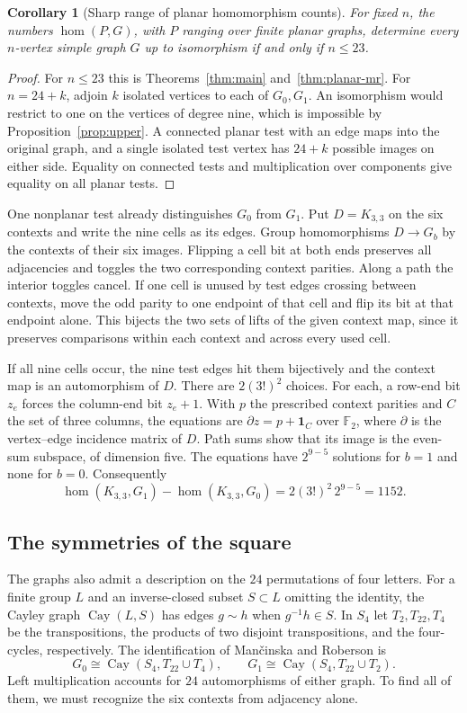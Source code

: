 \documentclass[11pt,reqno]{amsart}
\numberwithin{equation}{section}
\newtheorem{corollary}[theorem]{Corollary}
\theoremstyle{definition}
\newcommand{\homc}{\operatorname{hom}}
\begin{document}
\begin{corollary}[Sharp range of planar homomorphism counts]\label{cor:threshold}
For fixed $n$, the numbers $\homc(P,G)$, with $P$ ranging over finite planar graphs, determine every $n$-vertex simple graph $G$ up to isomorphism if and only if $n\le23$.
\end{corollary}
\begin{proof}
For $n\le23$ this is Theorems~\ref{thm:main} and~\ref{thm:planar-mr}. For $n=24+k$, adjoin $k$ isolated vertices to each of $G_0,G_1$. An isomorphism would restrict to one on the vertices of degree nine, which is impossible by Proposition~\ref{prop:upper}. A connected planar test with an edge maps into the original graph, and a single isolated test vertex has $24+k$ possible images on either side. Equality on connected tests and multiplication over components give equality on all planar tests.
\end{proof}

One nonplanar test already distinguishes $G_0$ from $G_1$. Put $D=K_{3,3}$ on the six contexts and write the nine cells as its edges. Group homomorphisms $D\to G_b$ by the contexts of their six images. Flipping a cell bit at both ends preserves all adjacencies and toggles the two corresponding context parities. Along a path the interior toggles cancel. If one cell is unused by test edges crossing between contexts, move the odd parity to one endpoint of that cell and flip its bit at that endpoint alone. This bijects the two sets of lifts of the given context map, since it preserves comparisons within each context and across every used cell.

If all nine cells occur, the nine test edges hit them bijectively and the context map is an automorphism of $D$. There are $2(3!)^2$ choices. For each, a row-end bit $z_e$ forces the column-end bit $z_e+1$. With $p$ the prescribed context parities and $C$ the set of three columns, the equations are $\partial z=p+\mathbf 1_C$ over $\mathbb F_2$, where $\partial$ is the vertex--edge incidence matrix of $D$. Path sums show that its image is the even-sum subspace, of dimension five. The equations have $2^{9-5}$ solutions for $b=1$ and none for $b=0$. Consequently
\[
      \homc(K_{3,3},G_1)-\homc(K_{3,3},G_0)=2(3!)^2\,2^{9-5}=1152 .
\]

\subsection{The symmetries of the square}
The graphs also admit a description on the $24$ permutations of four letters. For a finite group $L$ and an inverse-closed subset $S\subset L$ omitting the identity, the Cayley graph $\operatorname{Cay}(L,S)$ has edges $g\sim h$ when $g^{-1}h\in S$. In $S_4$ let $T_2,T_{22},T_4$ be the transpositions, the products of two disjoint transpositions, and the four-cycles, respectively. The identification of Man\v{c}inska and Roberson \cite[\S8.2]{MR} is
\[
 G_0\cong\operatorname{Cay}(S_4,T_{22}\cup T_4),\qquad
 G_1\cong\operatorname{Cay}(S_4,T_{22}\cup T_2).
\]
Left multiplication accounts for $24$ automorphisms of either graph. To find all of them, we must recognize the six contexts from adjacency alone.
\end{document}
